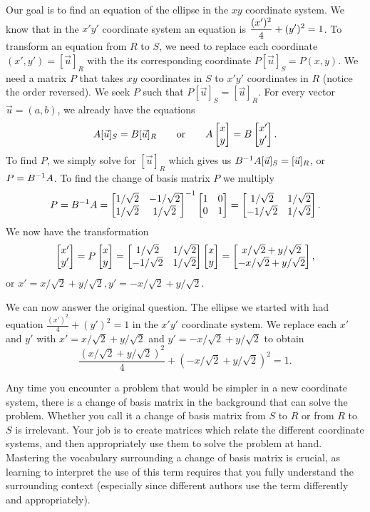 \begin{example}
Our goal is to find an equation of the ellipse in the $xy$ coordinate system. We know that in the $x'y'$ coordinate system an equation is $\displaystyle \frac{(x')^2}{4}+(y')^2=1$. 
To transform an equation from $R$ to $S$, we need to replace each coordinate $(x',y')=[\vec u]_{R}$ with the its corresponding coordinate $P[\vec u]_{S} = P(x,y)$.  
We need a matrix $P$ that takes $xy$ coordinates in $S$ to $x'y'$ coordinates in $R$ (notice the order reversed).  
We seek $P$ such that $P[\vec u]_{S} = [\vec u]_{R}$. 
For every vector $\vec u =(a,b)$, we already have the equations $$A[\vec u]_{S} = B[\vec u]_{R}\quad \quad \text{or}\quad \quad A\begin{bmatrix} x\\y \end{bmatrix}=B\begin{bmatrix} x'\\y' \end{bmatrix}.$$ 
To find $P$, we simply solve for $[\vec u]_{R}$ which gives us $B^{-1} A[\vec u]_{S} = [\vec u]_{R}$, or $P=B^{-1} A$.   
To find the change of basis matrix $P$ we multiply 
$$P=B^{-1} A = \begin{bmatrix} 1/\sqrt2 &-1/\sqrt2\\1/\sqrt2&1/\sqrt2 \end{bmatrix}^{-1} \begin{bmatrix} 1&0\\0&1 \end{bmatrix} = \begin{bmatrix} 1/\sqrt2 &1/\sqrt2\\-1/\sqrt2&1/\sqrt2 \end{bmatrix}.$$
We now have the transformation 
$$\begin{bmatrix} x'\\y' \end{bmatrix} = P\begin{bmatrix} x\\y \end{bmatrix} = \begin{bmatrix} 1/\sqrt2 &1/\sqrt2\\-1/\sqrt2&1/\sqrt2 \end{bmatrix}\begin{bmatrix} x\\y \end{bmatrix} = \begin{bmatrix} x/\sqrt2+y/\sqrt2\\-x/\sqrt2+y/\sqrt{2} \end{bmatrix},$$
or $x'=x/\sqrt2+y/\sqrt2, y'=-x/\sqrt2+y/\sqrt2$.

We can now answer the original question.  
The ellipse we started with had equation $\frac{(x')^2}{4}+(y')^2=1$ in the $x'y'$ coordinate system.  
We replace each $x'$ and $y'$ with $x'=x/\sqrt2+y/\sqrt2$ and $y'=-x/\sqrt2+y/\sqrt2$ to obtain  $$\frac{(x/\sqrt2+y/\sqrt2)^2}4+(-x/\sqrt2+y/\sqrt2)^2=1.$$
\end{example}

Any time you encounter a problem that would be simpler in a new coordinate system, there is a change of basis matrix in the background that can solve the problem. Whether you call it a change of basis matrix from $S$ to $R$ or from $R$ to $S$ is irrelevant.  Your job is to create matrices which relate the different coordinate systems, and then appropriately use them to solve the problem at hand. Mastering the vocabulary surrounding a change of basis matrix is crucial, as learning to interpret the use of this term requires that you fully understand the surrounding context (especially since different authors use the term differently and appropriately). 




